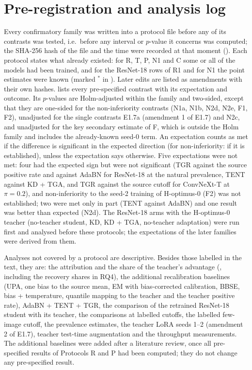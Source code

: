 \section{Pre-registration and analysis log}
\label{app:prereg}

Every confirmatory family was written into a protocol file before any of its contrasts was tested, i.e.\ before any
interval or $p$-value it concerns was computed; the SHA-256 hash of the file and the time were recorded at that moment
(). Each protocol states what already existed: for R, T, P, N1 and C some or all of the
models had been trained, and for the ResNet-18 rows of R1 and for N1 the point estimates were known (marked $^\ast$ in
).
Later edits are listed as amendments with their own hashes.  lists every pre-specified contrast
with its expectation and outcome. Its $p$-values are Holm-adjusted within the family and two-sided, except that they
are one-sided for the non-inferiority contrasts (N1a, N1b, N2d, N2e, F1, F2), unadjusted for the single contrasts E1.7a
(amendment 1 of E1.7) and N2c, and unadjusted for the key secondary estimate of F, which is outside the Holm family
and includes the already-known seed-0 term. An expectation counts as met if the difference is significant in the
expected direction (for non-inferiority: if it is established), unless the expectation says otherwise. Five expectations were not met: four had the expected sign but were not significant (TGR
against the source positive rate and against AdaBN for ResNet-18 at the natural prevalence, TENT against KD + TGA, and
TGR against the source cutoff for ConvNeXt-T at $\pi=0.2$), and non-inferiority to the seed-2 training of H-optimus-0
(F2) was not established; two were met only in part (TENT against AdaBN) and one
result was better than expected (N2d).
The ResNet-18 arms with the H-optimus-0 teacher (no-teacher student, KD, KD + TGA, no-teacher adaptation) were run first
and analysed before these protocols; the expectations of the later families were derived from them.

Analyses not covered by a protocol are descriptive. Besides those labelled in the text, they are: the attribution and
the share of the teacher's advantage (, including the recovery shares in RQ4), the additional
recalibration baselines (UPA, one bias to the source mean, EM with bias-corrected calibration, BBSE, bias + temperature,
quantile mapping to the teacher and the teacher positive rate), AdaBN + TENT + TGR, the comparison of the retrained
ResNet-18 student with its teacher, the comparisons at labelled cutoffs, the labelled few-image cutoff, the prevalence
estimates, the teacher LoRA seeds 1--2 (amendment 2 of E1.7), teacher test-time augmentation and the throughput
measurements. The additional baselines
were added after a literature review, once all pre-specified results of Protocols R and P had been computed; they do
not change any pre-specified result.


